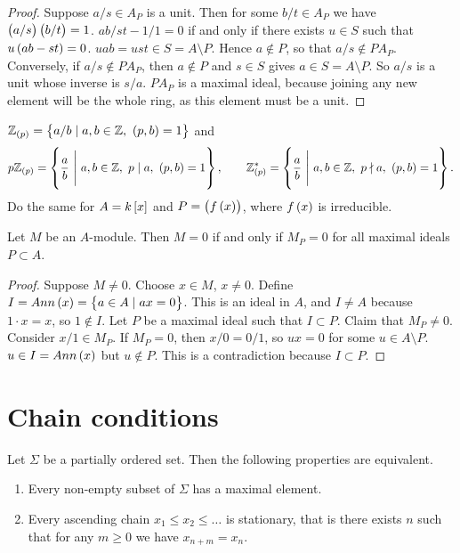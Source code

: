 \begin{proof}
Suppose $ a / s \in A_P $ is a unit. Then for some $ b / t \in A_P $ we have $ \br{a / s}\br{b / t} = 1 $. $ ab / st - 1 / 1 = 0 $ if and only if there exists $ u \in S $ such that $ u\br{ab - st} = 0 $. $ uab = ust \in S = A \setminus P $. Hence $ a \notin P $, so that $ a / s \notin PA_P $. Conversely, if $ a / s \notin PA_P $, then $ a \notin P $ and $ s \in S $ gives $ a \in S = A \setminus P $. So $ a / s $ is a unit whose inverse is $ s / a $. $ PA_P $ is a maximal ideal, because joining any new element will be the whole ring, as this element must be a unit.
\end{proof}

\begin{example*}
$ \Z_{\br{p}} = \cbr{a / b \mid a, b \in \Z, \ \br{p, b} = 1} $ and
$$ p\Z_{\br{p}} = \cbr{\dfrac{a}{b} \ \Bigg| \ a, b \in \Z, \ p \mid a, \ \br{p, b} = 1}, \qquad \Z_{\br{p}}^* = \cbr{\dfrac{a}{b} \ \Bigg| \ a, b \in \Z, \ p \nmid a, \ \br{p, b} = 1}. $$
Do the same for $ A = k\sbr{x} $ and $ P = \br{f\br{x}} $, where $ f\br{x} $ is irreducible.
\end{example*}

\begin{proposition}
Let $ M $ be an $ A $-module. Then $ M = 0 $ if and only if $ M_P = 0 $ for all maximal ideals $ P \subset A $.
\end{proposition}

\begin{proof}
Suppose $ M \ne 0 $. Choose $ x \in M $, $ x \ne 0 $. Define $ I = Ann\br{x} = \cbr{a \in A \mid ax = 0} $. This is an ideal in $ A $, and $ I \ne A $ because $ 1 \cdot x = x $, so $ 1 \notin I $. Let $ P $ be a maximal ideal such that $ I \subset P $. Claim that $ M_P \ne 0 $. Consider $ x / 1 \in M_P $. If $ M_P = 0 $, then $ x / 0 = 0 / 1 $, so $ ux = 0 $ for some $ u \in A \setminus P $. $ u \in I = Ann\br{x} $ but $ u \notin P $. This is a contradiction because $ I \subset P $.
\end{proof}

\pagebreak

\section{Chain conditions}


\begin{lemma}
Let $ \Sigma $ be a partially ordered set. Then the following properties are equivalent.
\begin{enumerate}
\item Every non-empty subset of $ \Sigma $ has a maximal element.
\item Every ascending chain $ x_1 \le x_2 \le \dots $ is stationary, that is there exists $ n $ such that for any $ m \ge 0 $ we have $ x_{n + m} = x_n $.
\end{enumerate}
\end{lemma}

